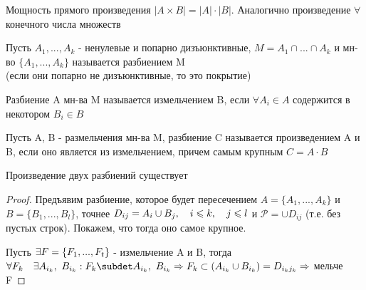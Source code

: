 \documentclass[discrete.tex]{subfiles}
\begin{document}
\begin{remark}
  Мощность прямого произведения $|A \times B| = |A| \cdot |B|$. Аналогично произведение $\forall$ конечного числа множеств
\end{remark}

\begin{definition}
  Пусть $A_1,...,A_k$ - ненулевые и попарно дизъюнктивные, $M = A_1 \cap ... \cap A_k$ и мн-во $\{A_1,...,A_k\}$ называется разбиением M\\
  (если они попарно не дизъюнктивные, то это покрытие)
\end{definition}

\begin{definition}
  Разбиение A мн-ва M называется измельчением B, если $\forall A_i \in A$ содержится в некотором $B_i \in B$
\end{definition}


\begin{definition}
  Пусть A, B - размельчения мн-ва M, разбиение C называется произведением A и B, если оно является из измельчением, причем самым крупным $C = A \cdot B$
\end{definition}

\begin{theorem}
  Произведение двух разбиений существует
\end{theorem}

\begin{proof}
  Предъявим разбиение, которое будет пересечением $A = \{A_1,...,A_k\}$ и $B = \{B_1,...,B_l\}$, точнее $D_{ij} = A_i \cup B_j,\quad i \leqslant k,\quad j \leqslant l$ и $\mathcal{P} = \cup D_{ij}$ (т.е. без пустых строк). Покажем, что тогда оно самое крупное.

  Пусть $\exists F = \{F_1,...,F_t\}$ - измельчение A и B, тогда $\forall F_k\q \e A_{i_k},\ B_{i_k}: F_k \subdet A_{i_k},\ B_{i_k} \Ra F_k \subset (A_{i_k} \cup B_{i_k}) = D_{i_k j_k} \Ra$ мельче F
\end{proof}
\end{document}
